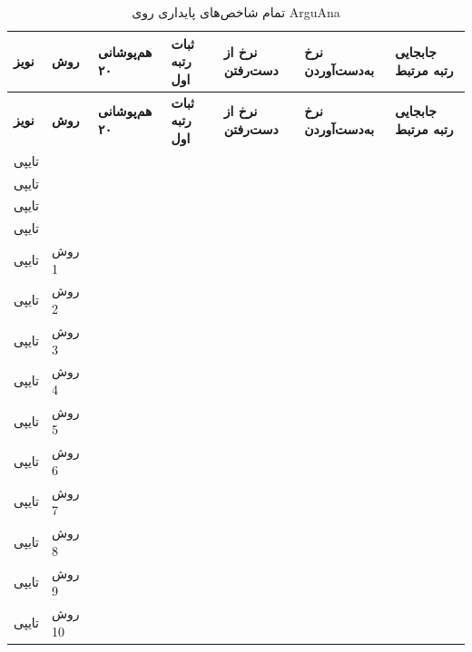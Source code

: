 \documentclass[a4paper,12pt]{article}
\begin{document}
\begin{landscape}
\scriptsize
\begin{longtable}{|C{2cm}|C{2.5cm}|C{2.4cm}|C{2.4cm}|C{2.4cm}|C{2.5cm}|C{2.7cm}|}
\caption{تمام شاخص‌های پایداری روی ArguAna}\label{tab:arguana-full-robustness}\\
\hline
\textbf{نویز} & \textbf{روش} & \textbf{هم‌پوشانی ۲۰} & \textbf{ثبات رتبه اول} & \textbf{نرخ از دست‌رفتن} & \textbf{نرخ به‌دست‌آوردن} & \textbf{جابجایی رتبه مرتبط} \\
\hline
\endfirsthead
\hline
\textbf{نویز} & \textbf{روش} & \textbf{هم‌پوشانی ۲۰} & \textbf{ثبات رتبه اول} & \textbf{نرخ از دست‌رفتن} & \textbf{نرخ به‌دست‌آوردن} & \textbf{جابجایی رتبه مرتبط} \\
\hline
\endhead
تایپی &  &  &  &  &  &  \\
\hline
تایپی &  &  &  &  &  &  \\
\hline
تایپی &  &  &  &  &  &  \\
\hline
تایپی &  &  &  &  &  &  \\
\hline
تایپی & روش 1 &  &  &  &  &  \\
\hline
تایپی & روش 2 &  &  &  &  &  \\
\hline
تایپی & روش 3 &  &  &  &  &  \\
\hline
تایپی & روش 4 &  &  &  &  &  \\
\hline
تایپی & روش 5 &  &  &  &  &  \\
\hline
تایپی & روش 6 &  &  &  &  &  \\
\hline
تایپی & روش 7 &  &  &  &  &  \\
\hline
تایپی & روش 8 &  &  &  &  &  \\
\hline
تایپی & روش 9 &  &  &  &  &  \\
\hline
تایپی & روش 10 &  &  &  &  &  \\

\end{longtable}
\end{landscape}
\end{document}
